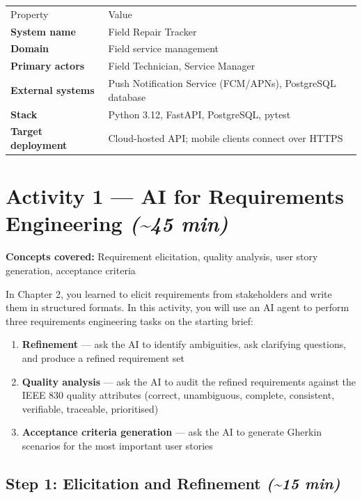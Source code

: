 \documentclass[11pt,a4paper]{book}
\begin{document}
\begin{tabular}{ll}
\hline
Property & Value \\
\textbf{System name} & Field Repair Tracker \\
\textbf{Domain} & Field service management \\
\textbf{Primary actors} & Field Technician, Service Manager \\
\textbf{External systems} & Push Notification Service (FCM/APNs), PostgreSQL database \\
\textbf{Stack} & Python 3.12, FastAPI, PostgreSQL, pytest \\
\textbf{Target deployment} & Cloud-hosted API; mobile clients connect over HTTPS \\
\hline
\end{tabular}

\medskip

\section{Activity 1 --- AI for Requirements Engineering \textit{(\textasciitilde{}45 min)}}

\textbf{Concepts covered:} Requirement elicitation, quality analysis, user story generation, acceptance criteria

In Chapter 2, you learned to elicit requirements from stakeholders and write them in structured formats. In this activity, you will use an AI agent to perform three requirements engineering tasks on the starting brief:

\begin{enumerate}
  \item \textbf{Refinement} --- ask the AI to identify ambiguities, ask clarifying questions, and produce a refined requirement set
  \item \textbf{Quality analysis} --- ask the AI to audit the refined requirements against the IEEE 830 quality attributes (correct, unambiguous, complete, consistent, verifiable, traceable, prioritised)
  \item \textbf{Acceptance criteria generation} --- ask the AI to generate Gherkin scenarios for the most important user stories
\end{enumerate}

\subsection{Step 1: Elicitation and Refinement \textit{(\textasciitilde{}15 min)}}
\end{document}
